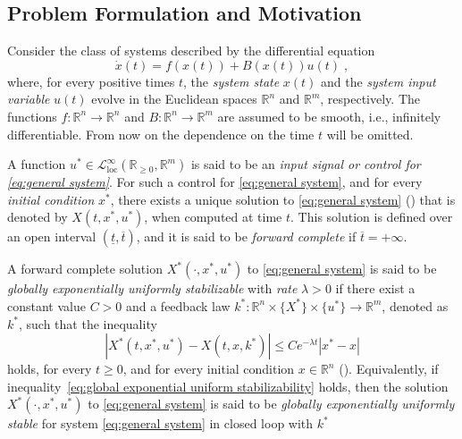\documentclass[10pt,twocolumn,twoside]{IEEEtran}
\newcounter{para}
\newcommand\mypara{\par}
\theoremstyle{plain}
\theoremstyle{definition}
\theoremstyle{remark}
\begin{document}
\subsection{Problem Formulation and Motivation}\label{sec:Problem Formulation and Motivation}

\mypara Consider the class of systems described by the differential equation
\begin{equation}\label{eq:general system}
	\dot{x}(t)=f(x(t))+B(x(t))u(t)\;,	
\end{equation}
where, for every positive times $t$, the \emph{system state} $x(t)$ and the \emph{system input variable} $u(t)$ evolve in the Euclidean spaces $\mathbb{R}^n$ and $\mathbb{R}^m$, respectively. The functions $f:\mathbb{R}^n\to\mathbb{R}^n$ and $B:\mathbb{R}^n\to\mathbb{R}^m$ are assumed to be smooth, i.e., infinitely differentiable. From now on the dependence on the time $t$ will be omitted.

\mypara A function $u^\ast\in\mathcal{L}_{\mathrm{loc}}^\infty(\mathbb{R}_{\geq0},\mathbb{R}^m)$ is said to be an \emph{input signal or control for \eqref{eq:general system}}. For such a control for \eqref{eq:general system}, and for every \emph{initial condition} $x^\ast$, there exists a unique solution to \eqref{eq:general system} (\cite{Teschl2012}) that is denoted by $X(t,x^\ast,u^\ast)$, when computed at time $t$. This solution is defined over an open interval $(\underline{t},\overline{t})$, and it is said to be \emph{forward complete} if $\overline{t}=+\infty$.

\mypara A forward complete solution $X^\ast(\cdot,x^\ast,u^\ast)$ to \eqref{eq:general system} is said to be  \emph{globally exponentially uniformly stabilizable} with \emph{rate} $\lambda>0$ if there exist a constant value $C>0$ and a feedback law $k^\ast:\mathbb{R}^n\times\{X^\ast\}\times\{u^\ast\}\to\mathbb{R}^m$, denoted as $k^\ast$, such that the inequality
\begin{equation}\label{eq:global exponential uniform stabilizability}
	\left|X^\ast(t,x^\ast,u^\ast)-X(t,x,k^\ast)\right|\leq Ce^{-\lambda t}|x^\ast-x|
\end{equation}
holds, for every $t\geq0$, and for every initial condition $x\in\mathbb{R}^n$ (\cite{Manchester2014a}). Equivalently, if inequality~\eqref{eq:global exponential uniform stabilizability} holds, then the solution $X^\ast(\cdot,x^\ast,u^\ast)$ to \eqref{eq:general system} is said to be \emph{globally exponentially uniformly stable} for system \eqref{eq:general system} in closed loop with $k^\ast$
\end{document}
